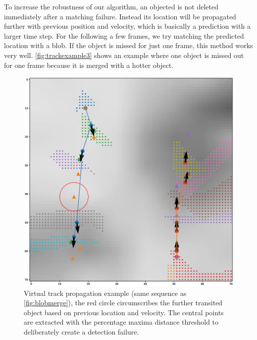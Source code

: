 To increase the robustness of our algorithm, an objected is not deleted immediately after a matching failure. Instead its location will be propagated further with previous position and velocity, which is basically a prediction with a larger time step. For the following a few frames, we try matching the predicted location with a blob. If the object is missed for just one frame, this method works very well. \autoref{fig:trackexample3} shows an example where one object is missed out for one frame because it is merged with a hotter object.
\begin{figure}
  \centering
  \includegraphics[width=\textwidth]{figures/trackexample3.eps}
  \caption{Virtual track propagation example (same sequence as \autoref{fig:blobmerge}), the red circle circumscribes the further transited object based on previous location and velocity. The central points are extracted with the percentage maxima distance threshold to deliberately create a detection failure. }\label{fig:trackexample3}
\end{figure}

